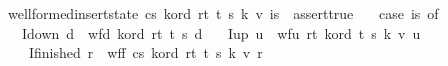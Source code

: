 \begin{isabellebody}
\isanewline
{\isachardoublequoteopen}wellformed{\isacharunderscore}insert{\isacharunderscore}state\ cs\ k{\isacharunderscore}ord\ r{}t\ t{}\ s\ k\ v\ is\ {\isacharequal}\ assert{\isacharunderscore}true\ {\isacharparenleft}\isanewline
\ \ case\ is\ of\ \isanewline
\ \ I{\isacharunderscore}down\ d\ {\isasymRightarrow}\ {\isacharparenleft}wf{\isacharunderscore}d\ k{\isacharunderscore}ord\ r{}t\ t{}\ s\ d{\isacharparenright}\isanewline
\ \ {\isacharbar}\ I{\isacharunderscore}up\ u\ {\isasymRightarrow}\ {\isacharparenleft}wf{\isacharunderscore}u\ r{}t\ k{\isacharunderscore}ord\ t{}\ s\ k\ v\ u{\isacharparenright}\isanewline
\ \ {\isacharbar}\ I{\isacharunderscore}finished\ r\ {\isasymRightarrow}\ {\isacharparenleft}wf{\isacharunderscore}f\ cs\ k{\isacharunderscore}ord\ r{}t\ t{}\ s\ k\ v\ r{\isacharparenright}\ {\isacharparenright}{\isachardoublequoteclose}\isanewline
\isanewline
%
\isadelimtheory
\isanewline
%
\endisadelimtheory
%
\isatagtheory
{}\isamarkupfalse%
%
\endisatagtheory
{\isafoldtheory}%
%
\isadelimtheory
%
\endisadelimtheory
\end{isabellebody}%
